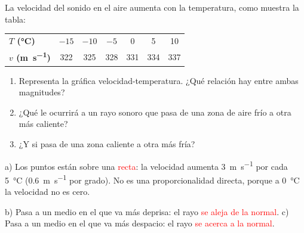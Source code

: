 \begin{exercise}
    La velocidad del sonido en el aire aumenta con la temperatura, como muestra la tabla:
    \begin{center}
        \begin{tabular}{@{}lcccccc@{}}
            \toprule
            \textbf{\(T\) (\unit{\degreeCelsius})} & \(-15\) & \(-10\) & \(-5\) & 0 & 5 & 10 \\[3pt]
            \textbf{\(v\) (\unit{\m\per\s})} & 322 & 325 & 328 & 331 & 334 & 337 \\
            \bottomrule
        \end{tabular}
    \end{center}
    \begin{enumerate}[label=\alph*)]
        \item Representa la gráfica velocidad-temperatura. ¿Qué relación hay entre ambas magnitudes?
        \item ¿Qué le ocurrirá a un rayo sonoro que pasa de una zona de aire frío a otra más caliente?
        \item ¿Y si pasa de una zona caliente a otra más fría?
    \end{enumerate}
    \begin{solu}
        a) Los puntos están sobre una \textcolor{red}{recta}: la velocidad aumenta \qty{3}{\m\per\s} por cada \qty{5}{\degreeCelsius} (\qty{0.6}{\m\per\s} por grado). No es una proporcionalidad directa, porque a \qty{0}{\degreeCelsius} la velocidad no es cero.
        \begin{center}
        \end{center}
        b) Pasa a un medio en el que va más deprisa: el rayo \textcolor{red}{se aleja de la normal}.
        c) Pasa a un medio en el que va más despacio: el rayo \textcolor{red}{se acerca a la normal}.
    \end{solu}
\end{exercise}

